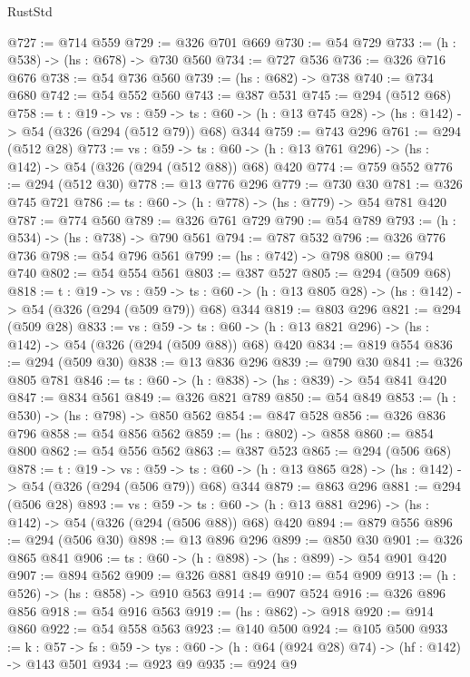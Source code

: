 \begin{lexlean}{RustStd}
\begin{coremodule}
@727 := @714 @559
@729 := @326 @701 @669
@730 := @54 @729
@733 := (h : @538) -> (hs : @678) -> @730 @560
@734 := @727 @536
@736 := @326 @716 @676
@738 := @54 @736 @560
@739 := (hs : @682) -> @738
@740 := @734 @680
@742 := @54 @552 @560
@743 := @387 @531
@745 := @294 (@512 @68)
@758 := {t : @19} ->
  {vs : @59} ->
  {ts : @60} -> (h : @13 @745 @28) -> (hs : @142) -> @54 (@326 (@294 (@512 @79)) @68) @344
@759 := @743 @296
@761 := @294 (@512 @28)
@773 := {vs : @59} ->
  {ts : @60} -> (h : @13 @761 @296) -> (hs : @142) -> @54 (@326 (@294 (@512 @88)) @68) @420
@774 := @759 @552
@776 := @294 (@512 @30)
@778 := @13 @776 @296
@779 := @730 @30
@781 := @326 @745 @721
@786 := {ts : @60} -> (h : @778) -> (hs : @779) -> @54 @781 @420
@787 := @774 @560
@789 := @326 @761 @729
@790 := @54 @789
@793 := (h : @534) -> (hs : @738) -> @790 @561
@794 := @787 @532
@796 := @326 @776 @736
@798 := @54 @796 @561
@799 := (hs : @742) -> @798
@800 := @794 @740
@802 := @54 @554 @561
@803 := @387 @527
@805 := @294 (@509 @68)
@818 := {t : @19} ->
  {vs : @59} ->
  {ts : @60} -> (h : @13 @805 @28) -> (hs : @142) -> @54 (@326 (@294 (@509 @79)) @68) @344
@819 := @803 @296
@821 := @294 (@509 @28)
@833 := {vs : @59} ->
  {ts : @60} -> (h : @13 @821 @296) -> (hs : @142) -> @54 (@326 (@294 (@509 @88)) @68) @420
@834 := @819 @554
@836 := @294 (@509 @30)
@838 := @13 @836 @296
@839 := @790 @30
@841 := @326 @805 @781
@846 := {ts : @60} -> (h : @838) -> (hs : @839) -> @54 @841 @420
@847 := @834 @561
@849 := @326 @821 @789
@850 := @54 @849
@853 := (h : @530) -> (hs : @798) -> @850 @562
@854 := @847 @528
@856 := @326 @836 @796
@858 := @54 @856 @562
@859 := (hs : @802) -> @858
@860 := @854 @800
@862 := @54 @556 @562
@863 := @387 @523
@865 := @294 (@506 @68)
@878 := {t : @19} ->
  {vs : @59} ->
  {ts : @60} -> (h : @13 @865 @28) -> (hs : @142) -> @54 (@326 (@294 (@506 @79)) @68) @344
@879 := @863 @296
@881 := @294 (@506 @28)
@893 := {vs : @59} ->
  {ts : @60} -> (h : @13 @881 @296) -> (hs : @142) -> @54 (@326 (@294 (@506 @88)) @68) @420
@894 := @879 @556
@896 := @294 (@506 @30)
@898 := @13 @896 @296
@899 := @850 @30
@901 := @326 @865 @841
@906 := {ts : @60} -> (h : @898) -> (hs : @899) -> @54 @901 @420
@907 := @894 @562
@909 := @326 @881 @849
@910 := @54 @909
@913 := (h : @526) -> (hs : @858) -> @910 @563
@914 := @907 @524
@916 := @326 @896 @856
@918 := @54 @916 @563
@919 := (hs : @862) -> @918
@920 := @914 @860
@922 := @54 @558 @563
@923 := @140 @500
@924 := @105 @500
@933 := {k : @57} ->
  {fs : @59} -> {tys : @60} -> (h : @64 (@924 @28) @74) -> (hf : @142) -> @143 @501
@934 := @923 @9
@935 := @924 @9

\end{coremodule}
\end{lexlean}

